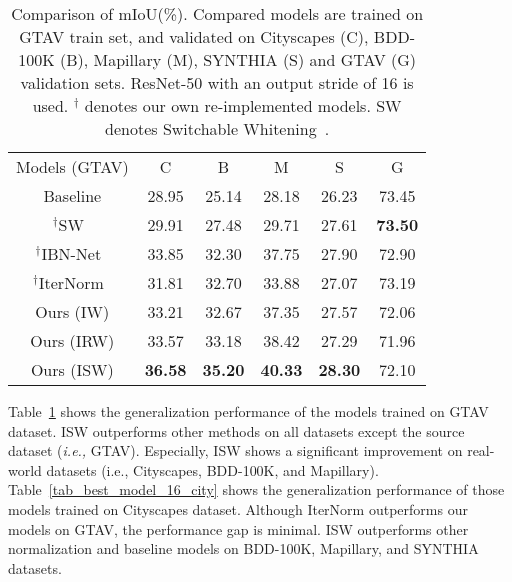 \documentclass[final]{latex/cvpr}
\newcommand{\drule}{\specialrule{0.2pt}{1pt}{1pt}\specialrule{0.2pt}{0pt}{\belowrulesep}}
\begin{document}
\begin{table}[t!]
\vspace*{-0.0cm}
\begin{center}
\footnotesize
\begin{tabular}{c|c|c|c|c||c}
\toprule
Models (GTAV) & C & B & M & S & G\\
\drule
Baseline  & 28.95        & 25.14      & 28.18      & 26.23      & 73.45 \\ 
\midrule
$^\dagger$SW~\cite{pan2019switchable} & 29.91      & 27.48      & 29.71      & 27.61      & \textbf{73.50}     \\ 
\midrule
$^\dagger$IBN-Net~\cite{pan2018two}      & 33.85      & 32.30      & 37.75      & 27.90 & 72.90      \\ 
\midrule
$^\dagger$IterNorm~\cite{huang2019iterative} & 31.81      & 32.70      & 33.88      & 27.07      & 73.19     \\ 
\midrule
Ours (IW) & 33.21      & 32.67      & 37.35      & 27.57      & 72.06      \\ 
\midrule
Ours (IRW)                   & 33.57      & 33.18      & 38.42      & 27.29      & 71.96      \\ 
\midrule
Ours (ISW)                   & \textbf{36.58}      & \textbf{35.20} & \textbf{40.33} & \textbf{28.30}      & 72.10      \\ 
\bottomrule
\end{tabular}
\end{center}
\vspace*{-0.15cm}
\caption{Comparison of mIoU(\%). Compared models are trained on GTAV train set, and validated on Cityscapes (C), BDD-100K (B), Mapillary (M), SYNTHIA (S) and GTAV (G) validation sets. ResNet-50 with an output stride of 16 is used.
$^\dagger$ denotes our own re-implemented models. SW denotes Switchable Whitening~\cite{pan2019switchable}.}
\label{tab_best_model_16_gtav}
\vspace*{-0.53cm}
\end{table}

Table~\ref{tab_best_model_16_gtav} shows the generalization performance of the models trained on GTAV dataset. ISW outperforms other methods on all datasets except the source dataset (\textit{i.e.,} GTAV). Especially, ISW shows a significant improvement on real-world datasets (i.e., Cityscapes, BDD-100K, and Mapillary). Table~\ref{tab_best_model_16_city} shows the generalization performance of those models trained on Cityscapes dataset. 
Although IterNorm outperforms our models on GTAV, the performance gap is minimal. 
ISW outperforms other normalization and baseline models on BDD-100K, Mapillary, and SYNTHIA datasets. 
\end{document}
